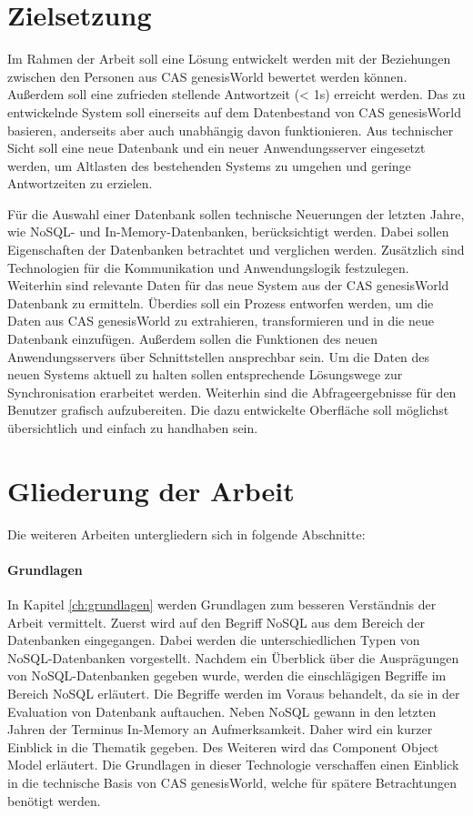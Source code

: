 \section{Zielsetzung}
\label{ch:Einfuehrung:sec:Zielsetzung}

Im Rahmen der Arbeit soll eine Lösung entwickelt werden mit der Beziehungen zwischen den Personen aus CAS genesisWorld bewertet werden können. Außerdem soll eine zufrieden stellende Antwortzeit (< 1s) erreicht werden. Das zu entwickelnde System soll einerseits auf dem Datenbestand von CAS genesisWorld basieren, anderseits aber auch unabhängig davon funktionieren. Aus technischer Sicht soll eine neue Datenbank und ein neuer Anwendungsserver eingesetzt werden, um Altlasten des bestehenden Systems zu umgehen und geringe Antwortzeiten zu erzielen. 

Für die Auswahl einer Datenbank sollen technische Neuerungen der letzten Jahre, wie NoSQL- und In-Memory-Datenbanken, berücksichtigt werden. Dabei sollen Eigenschaften der Datenbanken betrachtet und verglichen werden. Zusätzlich sind Technologien für die Kommunikation und Anwendungslogik festzulegen. Weiterhin sind relevante Daten für das neue System aus der CAS genesisWorld Datenbank zu ermitteln. Überdies soll ein Prozess entworfen werden, um die Daten aus CAS genesisWorld zu extrahieren, transformieren und in die neue Datenbank einzufügen. Außerdem sollen die Funktionen des neuen Anwendungsservers über Schnittstellen ansprechbar sein. Um die Daten des neuen Systems aktuell zu halten sollen entsprechende Lösungswege zur Synchronisation erarbeitet werden. Weiterhin sind die Abfrageergebnisse für den Benutzer grafisch aufzubereiten. Die dazu entwickelte Oberfläche soll möglichst übersichtlich und einfach zu handhaben sein.

\section{Gliederung der Arbeit}
\label{ch:Einfuehrung:sec:Gliederung}

Die weiteren Arbeiten untergliedern sich in folgende Abschnitte: 
 
\paragraph{Grundlagen} In Kapitel \ref{ch:grundlagen} werden Grundlagen zum besseren Verständnis der Arbeit vermittelt. Zuerst wird auf den Begriff NoSQL aus dem Bereich der Datenbanken eingegangen. Dabei werden die unterschiedlichen Typen von NoSQL-Datenbanken vorgestellt. Nachdem ein Überblick über die Ausprägungen von NoSQL-Datenbanken gegeben wurde, werden die einschlägigen Begriffe im Bereich NoSQL erläutert. Die Begriffe werden im Voraus behandelt, da sie in der Evaluation von Datenbank auftauchen. Neben NoSQL gewann in den letzten Jahren der Terminus In-Memory an Aufmerksamkeit. Daher wird ein kurzer Einblick in die Thematik gegeben. Des Weiteren wird das Component Object Model erläutert. Die Grundlagen in dieser Technologie verschaffen einen Einblick in die technische Basis von CAS genesisWorld, welche für spätere Betrachtungen benötigt werden. 

